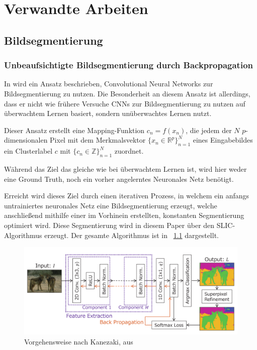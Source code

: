 \chapter{Verwandte Arbeiten}
\label{chap:verwarbeiten}

\section{Bildsegmentierung}
\label{sec:segmentation}

\subsection{Unbeaufsichtigte Bildsegmentierung durch Backpropagation}
\label{ssec:kanezaki}
In \cite{kanezaki_18} wird ein Ansatz beschrieben, Convolutional Neural Networks zur Bildsegmentierung zu nutzen. Die Besonderheit an diesem Ansatz ist allerdings, dass er nicht wie frühere Versuche CNNs zur Bildsegmentierung zu nutzen auf überwachtem Lernen basiert, sondern unüberwachtes Lernen nutzt.

Dieser Ansatz erstellt eine Mapping-Funktion $c_n=f(x_n)$, die jedem der $N$ $p$-dimensionalen Pixel mit dem Merkmalsvektor $\{x_n\in\mathbb{R}^p\}_{n=1}^N$ eines Eingabebildes ein Clusterlabel $c$ mit $\{c_n\in\mathbb{Z}\}_{n=1}^N$ zuordnet.

Während das Ziel das gleiche wie bei überwachtem Lernen ist, wird hier weder eine Ground Truth, noch ein vorher angelerntes Neuronales Netz benötigt.

Erreicht wird dieses Ziel durch einen iterativen Prozess, in welchem ein anfangs untrainiertes neuronales Netz eine Bildsegmentierung erzeugt, welche anschließend mithilfe einer im Vorhinein erstellten, konstanten Segmentierung optimiert wird. Diese Segmentierung wird in diesem Paper über den SLIC-Algorithmus \cite{achanta_10} erzeugt. Der gesamte Algorithmus ist in \figurename~\ref{fig:Kan18_01} dargestellt. 

\begin{figure}[h!]
	\centering
	\includegraphics[width=.8\textwidth,keepaspectratio]{images/Kan18_01.png}
	\caption{Vorgehensweise nach Kanezaki, aus \cite{kanezaki_18}}
	\label{fig:Kan18_01}
\end{figure}

